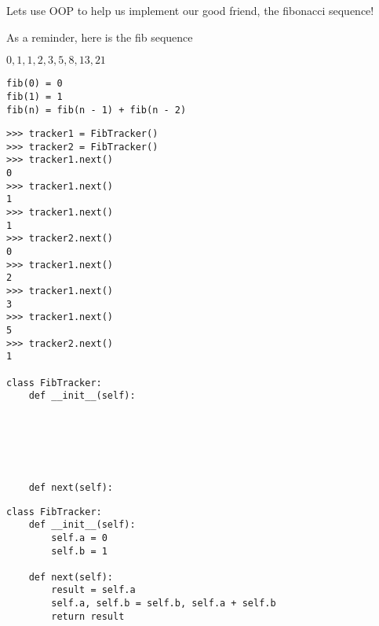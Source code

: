 \begin{blocksection}
\question Lets use OOP to help us implement our good friend, the fibonacci sequence!

As a reminder, here is the fib sequence

$0, 1, 1, 2, 3, 5, 8, 13, 21$


\begin{lstlisting}
fib(0) = 0
fib(1) = 1
fib(n) = fib(n - 1) + fib(n - 2)
\end{lstlisting}


\vspace{2\baselineskip}
\begin{nonsol}
\begin{lstlisting}
>>> tracker1 = FibTracker()
>>> tracker2 = FibTracker()
>>> tracker1.next()
0
>>> tracker1.next()
1
>>> tracker1.next()
1
>>> tracker2.next()
0
>>> tracker1.next()
2
>>> tracker1.next()
3
>>> tracker1.next()
5
>>> tracker2.next()
1

class FibTracker:
    def __init__(self):






    def next(self):
\end{lstlisting}
\end{nonsol}

\begin{solution}[0.3in]
\begin{lstlisting}
class FibTracker:
    def __init__(self):
        self.a = 0
        self.b = 1

    def next(self):
        result = self.a
        self.a, self.b = self.b, self.a + self.b
        return result
\end{lstlisting}
\end{solution}

\end{blocksection}
